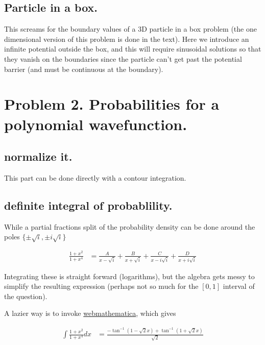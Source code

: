\documentclass{article}
\begin{document}
\subsection{ Particle in a box. }

This screams for the boundary values of a 3D particle in a box problem
(the one dimensional version of this problem is done in the text).
Here we introduce an infinite potential outside the
box, and this will require sinusoidal solutions so that they vanish on
the boundaries since the particle can't get past the potential
barrier (and must be continuous at the boundary).

\section{ Problem 2. Probabilities for a polynomial wavefunction. }

\subsection{ normalize it. }

This part can be done directly with a contour integration.

\subsection{ definite integral of probablility. }

While a partial fractions split of the probability density can be done
around the poles $\{\pm\sqrt{i}, \pm i \sqrt{i}\}$

\begin{align*}
\frac{1 + x^2}{1 + x^4} &=
\frac{A}{x -\sqrt{i}}
+\frac{B}{x +\sqrt{i}}
+\frac{C}{x -i\sqrt{i}}
+\frac{D}{x +i\sqrt{i}}
\end{align*}

Integrating these is straight forward (logarithms), but
the algebra gets messy to simplify the resulting expression (perhaps not so
much for the $[0,1]$ interval of the question).

A lazier way is to invoke \href{http://integrals.wolfram.com/index.jsp}{webmathematica}, which gives

\begin{align*}
\int \frac{1 + x^2}{1 + x^4} dx &=
\frac{-\tan^{-1}(1 - \sqrt{2} x) + \tan^{-1}(1 + \sqrt{2} x)}{ \sqrt{2} }
\end{align*}



\end{document}
